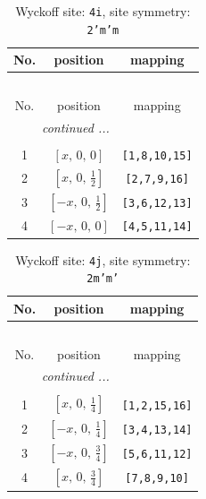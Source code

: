 \documentclass[fleqn,8pt]{jsarticle}
\begin{document}
\begin{longtable}{ccc}
\caption{Wyckoff site: {\tt 4i}, site symmetry: {\tt 2'm'm}}
 \\
 \hline \hline
No. & position & mapping \\ \hline \endfirsthead

\multicolumn{2}{l}{\tablename\ \thetable{}} \\
 \hline \hline
No. & position & mapping \\ \hline \endhead

 \hline \hline
\multicolumn{2}{r}{\footnotesize\it continued ...} \\ \endfoot

 \hline \hline
\multicolumn{2}{r}{} \\ \endlastfoot

1 & $\left[ x,\, 0,\, 0 \right]$ & {\tt [1,8,10,15]} \\ \hline
2 & $\left[ x,\, 0,\, \frac{1}{2} \right]$ & {\tt [2,7,9,16]} \\ \hline
3 & $\left[ - x,\, 0,\, \frac{1}{2} \right]$ & {\tt [3,6,12,13]} \\ \hline
4 & $\left[ - x,\, 0,\, 0 \right]$ & {\tt [4,5,11,14]} \\
\end{longtable}
\renewcommand{\arraystretch}{1.2}
\begin{longtable}{ccc}
\caption{Wyckoff site: {\tt 4j}, site symmetry: {\tt 2m'm'}}
 \\
 \hline \hline
No. & position & mapping \\ \hline \endfirsthead

\multicolumn{2}{l}{\tablename\ \thetable{}} \\
 \hline \hline
No. & position & mapping \\ \hline \endhead

 \hline \hline
\multicolumn{2}{r}{\footnotesize\it continued ...} \\ \endfoot

 \hline \hline
\multicolumn{2}{r}{} \\ \endlastfoot

1 & $\left[ x,\, 0,\, \frac{1}{4} \right]$ & {\tt [1,2,15,16]} \\ \hline
2 & $\left[ - x,\, 0,\, \frac{1}{4} \right]$ & {\tt [3,4,13,14]} \\ \hline
3 & $\left[ - x,\, 0,\, \frac{3}{4} \right]$ & {\tt [5,6,11,12]} \\ \hline
4 & $\left[ x,\, 0,\, \frac{3}{4} \right]$ & {\tt [7,8,9,10]} \\
\end{longtable}
\end{document}
